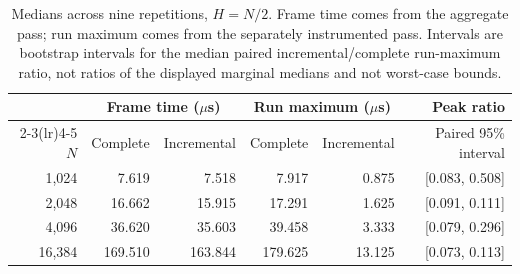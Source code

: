 \begin{table}[tb]
\centering\small
\begin{tabular}{@{}rrr rrr@{}}
\toprule
& \multicolumn{2}{c}{Frame time ($\mu$s)} & \multicolumn{2}{c}{Run maximum ($\mu$s)} & Peak ratio \\
\cmidrule(lr){2-3}\cmidrule(lr){4-5}
$N$ & Complete & Incremental & Complete & Incremental & Paired 95\% interval \\
\midrule
1,024 & 7.619 & 7.518 & 7.917 & 0.875 & [0.083, 0.508] \\
2,048 & 16.662 & 15.915 & 17.291 & 1.625 & [0.091, 0.111] \\
4,096 & 36.620 & 35.603 & 39.458 & 3.333 & [0.079, 0.296] \\
16,384 & 169.510 & 163.844 & 179.625 & 13.125 & [0.073, 0.113] \\
\bottomrule
\end{tabular}
\caption{Medians across nine repetitions, $H=N/2$. Frame time comes from the aggregate pass; run maximum comes from the separately instrumented pass. Intervals are bootstrap intervals for the median paired incremental/complete run-maximum ratio, not ratios of the displayed marginal medians and not worst-case bounds.}
\label{tab:timing}
\end{table}
